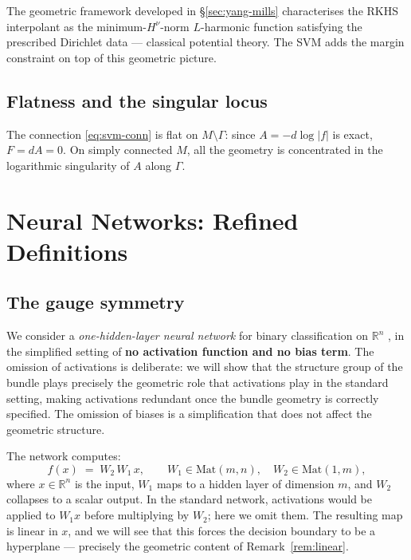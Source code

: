 \documentclass[11pt, a4paper]{article}
\theoremstyle{plain}
\theoremstyle{definition}
\newcommand{\R}{\mathbb{R}}
\newcommand{\Gam}{\Gamma}
\begin{document}
The geometric framework developed in \S\ref{sec:yang-mills} characterises the
RKHS interpolant as the minimum-$H^\nu$-norm $L$-harmonic function satisfying the
prescribed Dirichlet data — classical potential theory. The SVM adds the margin
constraint on top of this geometric picture.

\subsection{Flatness and the singular locus}

The connection \eqref{eq:svm-conn} is flat on $M\setminus\Gam$: since
$A = -d\log|f|$ is exact, $F = dA = 0$. On simply connected $M$, all the geometry
is concentrated in the logarithmic singularity of $A$ along $\Gam$.

\section{Neural Networks: Refined Definitions}\label{sec:nn}

\subsection{The gauge symmetry}

We consider a \emph{one-hidden-layer neural network} for binary classification on
$\R^n$ \cite{goodfellow2016}, in the simplified setting of \textbf{no activation function and no bias
term}. The omission of activations is deliberate: we will show that the structure
group of the bundle plays precisely the geometric role that activations play in the
standard setting, making activations redundant once the bundle geometry is correctly
specified. The omission of biases is a simplification that does not affect the
geometric structure.

The network computes:
\[
  f(x) \;=\; W_2\,W_1\,x, \qquad
  W_1 \in \mathrm{Mat}(m, n),\quad W_2 \in \mathrm{Mat}(1, m),
\]
where $x \in \R^n$ is the input, $W_1$ maps to a hidden layer of dimension $m$,
and $W_2$ collapses to a scalar output. In the standard network, activations would
be applied to $W_1 x$ before multiplying by $W_2$; here we omit them. The
resulting map is linear in $x$, and we will see that this forces the decision
boundary to be a hyperplane --- precisely the geometric content of Remark~\ref{rem:linear}.
\end{document}
